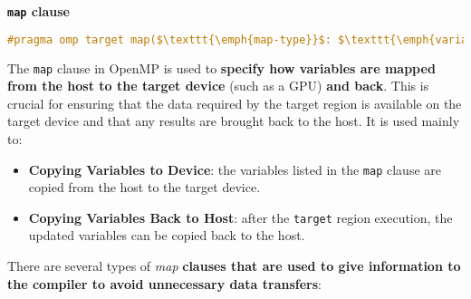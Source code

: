 \highspace
\begin{flushleft}
    \textcolor{Green3}{ \textbf{\texttt{map} clause}}
\end{flushleft}
\begin{openmpbox}
    \begin{lstlisting}[language=C++]
#pragma omp target map($\texttt{\emph{map-type}}$: $\texttt{\emph{variables}}$)\end{lstlisting}
\end{openmpbox}

\noindent
The \texttt{map} clause in OpenMP is used to \textbf{specify how variables are mapped from the host to the target device} (such as a GPU) \textbf{and back}. This is crucial for ensuring that the data required by the target region is available on the target device and that any results are brought back to the host. It is used mainly to:
\begin{itemize}
    \item \textbf{Copying Variables to Device}: the variables listed in the \texttt{map} clause are copied from the host to the target device.
    \item \textbf{Copying Variables Back to Host}: after the \texttt{target} region execution, the updated variables can be copied back to the host.
\end{itemize}
There are several types of \textsl{map} \textbf{clauses that are used to give information to the compiler to avoid unnecessary data transfers}:
